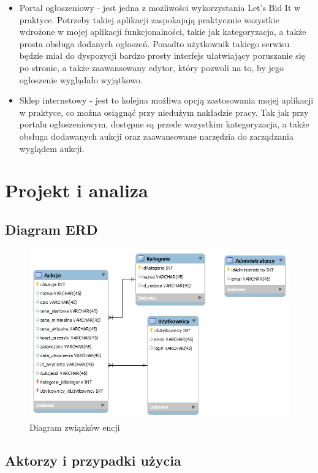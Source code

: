 \documentclass[brudnopis]{xmgr}
\begin{document}
\begin{itemize}

\item Portal ogłoszeniowy - jest jedna z możliwości wykorzystania Let's Bid It w praktyce. Potrzeby takiej aplikacji zaspokajają praktycznie wszystkie wdrożone w mojej aplikacji funkcjonalności, takie jak kategoryzacja, a także prosta obsługa dodanych ogłoszeń. Ponadto użytkownik takiego  serwisu będzie miał do dyspozycji bardzo prosty interfejs ułatwiający poruszanie się po stronie, a także zaawansowany edytor, który pozwoli na to, by jego ogłoszenie wyglądało wyjątkowo.

\item Sklep internetowy - jest to kolejna możliwa opcją zastosowania mojej aplikacji w praktyce, co można osiągnąć przy niedużym nakładzie pracy. Tak jak przy portalu ogłoszeniowym, dostępne są przede wszystkim kategoryzacja, a także obsługa dodawanych aukcji oraz zaawansowane narzędzia do zarządzania wyglądem aukcji.

\end{itemize}

\chapter{Projekt i analiza}

\section{Diagram ERD}

\begin{figure}[!tbh]
\centering
\includegraphics[width=.8\linewidth]{erd}
\caption{Diagram związków encji\label{RYS.1}}
\end{figure}

\section{Aktorzy i przypadki użycia}
\end{document}
